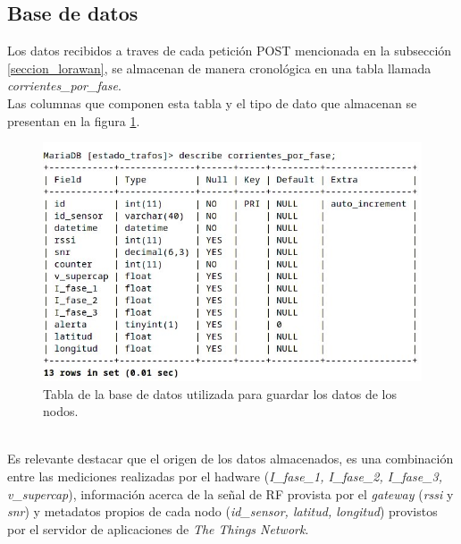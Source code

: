 \subsection{Base de datos}
Los datos recibidos a traves de cada petición POST mencionada en la subsecci\'{o}n \ref{seccion_lorawan}, se almacenan de manera cronológica en una tabla llamada \textit{corrientes\_por\_fase}.\\
Las columnas que componen esta tabla y el tipo de dato que almacenan se presentan en la figura \ref{fig:tablacorrientesporfase}.\\
\begin{figure}[h]
	\centering
	\includegraphics[width=1.0\linewidth]{Figures/tabla_corrientes_por_fase}
	\caption{Tabla de la base de datos utilizada para guardar los datos de los nodos.}
	\label{fig:tablacorrientesporfase}
\end{figure}\\
Es relevante destacar que el origen de los datos almacenados, es una combinación entre las mediciones realizadas por el hadware (\textit{I\_fase\_1, I\_fase\_2, I\_fase\_3, v\_supercap}), información acerca de la señal de RF provista por el \textit{gateway} (\textit{rssi} y \textit{snr}) y metadatos propios de cada nodo (\textit{id\_sensor, latitud, longitud}) provistos por el servidor de aplicaciones de \textit{The Things Network}.\\


